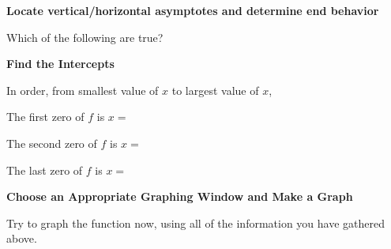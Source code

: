 \documentclass{ximera}
\begin{document}
 \textbf{Locate vertical/horizontal asymptotes and determine end behavior}
 
 \begin{question}
 Which of the following are true?
 
 \begin{multipleChoice}
    \end{multipleChoice}
    \end{question}
    
  \textbf{Find the Intercepts}
  
 In order, from smallest value of $x$ to largest value of $x$, 
 
 \begin{question}
 	The first zero of $f$ is $x=$ 
 \end{question}
 
  \begin{question}
 	The second zero of $f$ is $x=$ 
 \end{question}
 
  \begin{question}
 	The last zero of $f$ is $x=$ 
 \end{question}
 
  \textbf{Choose an Appropriate Graphing Window and Make a Graph}
  
  Try to graph the function now, using all of the information you have gathered above.    
  
\end{document}
